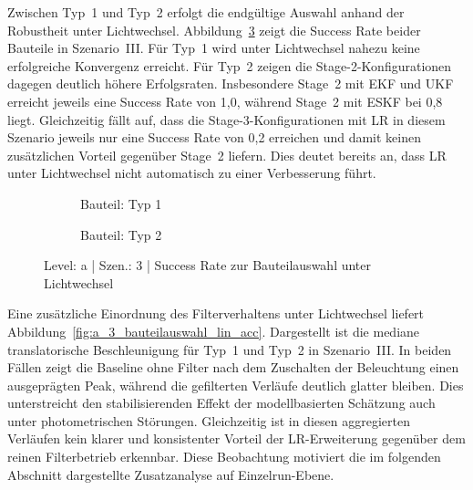 Zwischen Typ~1 und Typ~2 erfolgt die endgültige Auswahl anhand der Robustheit unter Lichtwechsel. Abbildung~\ref{fig:a_3_bauteilauswahl_success_rate} zeigt die Success Rate beider Bauteile in Szenario~III. Für Typ~1 wird unter Lichtwechsel nahezu keine erfolgreiche Konvergenz erreicht. Für Typ~2 zeigen die Stage-2-Konfigurationen dagegen deutlich höhere Erfolgsraten. Insbesondere Stage~2 mit \ac{EKF} und \ac{UKF} erreicht jeweils eine Success Rate von 1{,}0, während Stage~2 mit \ac{ESKF} bei 0{,}8 liegt. Gleichzeitig fällt auf, dass die Stage-3-Konfigurationen mit \ac{LR} in diesem Szenario jeweils nur eine Success Rate von 0{,}2 erreichen und damit keinen zusätzlichen Vorteil gegenüber Stage~2 liefern. Dies deutet bereits an, dass \ac{LR} unter Lichtwechsel nicht automatisch zu einer Verbesserung führt.

\begin{figure}[htbp]
    \centering
    \begin{subfigure}[b]{0.49\textwidth}
        \caption{Bauteil: Typ 1}
        \label{fig:a_3_Typ1_success_rate}
    \end{subfigure}
    \hfill
    \begin{subfigure}[b]{0.49\textwidth}
        \caption{Bauteil: Typ 2}
        \label{fig:a_3_Typ2_success_rate}
    \end{subfigure}
    \caption{Level: a | Szen.: 3 | Success Rate zur Bauteilauswahl unter Lichtwechsel}
    \label{fig:a_3_bauteilauswahl_success_rate}
\end{figure}

Eine zusätzliche Einordnung des Filterverhaltens unter Lichtwechsel liefert Abbildung~\ref{fig:a_3_bauteilauswahl_lin_acc}. Dargestellt ist die mediane translatorische Beschleunigung für Typ~1 und Typ~2 in Szenario~III. In beiden Fällen zeigt die Baseline ohne Filter nach dem Zuschalten der Beleuchtung einen ausgeprägten Peak, während die gefilterten Verläufe deutlich glatter bleiben. Dies unterstreicht den stabilisierenden Effekt der modellbasierten Schätzung auch unter photometrischen Störungen. Gleichzeitig ist in diesen aggregierten Verläufen kein klarer und konsistenter Vorteil der \ac{LR}-Erweiterung gegenüber dem reinen Filterbetrieb erkennbar. Diese Beobachtung motiviert die im folgenden Abschnitt dargestellte Zusatzanalyse auf Einzelrun-Ebene.

